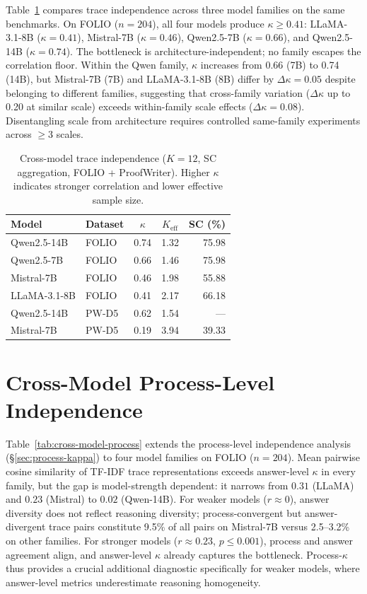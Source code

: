 Table~\ref{tab:cross_model_kappa} compares trace independence across three model families on the same benchmarks. On FOLIO ($n = 204$), all four models produce $\kappa \geq 0.41$: LLaMA-3.1-8B ($\kappa = 0.41$), Mistral-7B ($\kappa = 0.46$), Qwen2.5-7B ($\kappa = 0.66$), and Qwen2.5-14B ($\kappa = 0.74$). The bottleneck is architecture-independent; no family escapes the correlation floor. Within the Qwen family, $\kappa$ increases from 0.66 (7B) to 0.74 (14B), but Mistral-7B (7B) and LLaMA-3.1-8B (8B) differ by $\Delta\kappa = 0.05$ despite belonging to different families, suggesting that cross-family variation ($\Delta\kappa$ up to 0.20 at similar scale) exceeds within-family scale effects ($\Delta\kappa = 0.08$). Disentangling scale from architecture requires controlled same-family experiments across $\geq$3 scales.

\begin{table}[h]
\centering
\small
\caption{Cross-model trace independence ($K = 12$, SC aggregation, FOLIO + ProofWriter). Higher $\kappa$ indicates stronger correlation and lower effective sample size.}
\label{tab:cross_model_kappa}
\begin{tabular}{@{}llccr@{}}
\toprule
Model & Dataset & $\kappa$ & $K_{\text{eff}}$ & SC (\%) \\
\midrule
Qwen2.5-14B & FOLIO & 0.74 & 1.32 & 75.98 \\
Qwen2.5-7B & FOLIO & 0.66 & 1.46 & 75.98 \\
Mistral-7B & FOLIO & 0.46 & 1.98 & 55.88 \\
LLaMA-3.1-8B & FOLIO & 0.41 & 2.17 & 66.18 \\
\addlinespace
Qwen2.5-14B & PW-D5 & 0.62 & 1.54 & --- \\
Mistral-7B & PW-D5 & 0.19 & 3.94 & 39.33 \\
\bottomrule
\end{tabular}
\end{table}


\section{Cross-Model Process-Level Independence}
\label{app:cross-model-process}

Table~\ref{tab:cross-model-process} extends the process-level independence analysis (\S\ref{sec:process-kappa}) to four model families on FOLIO ($n = 204$). Mean pairwise cosine similarity of TF-IDF trace representations exceeds answer-level $\kappa$ in every family, but the gap is model-strength dependent: it narrows from $0.31$ (LLaMA) and $0.23$ (Mistral) to $0.02$ (Qwen-14B). For weaker models ($r \approx 0$), answer diversity does not reflect reasoning diversity; process-convergent but answer-divergent trace pairs constitute 9.5\% of all pairs on Mistral-7B versus 2.5--3.2\% on other families. For stronger models ($r \approx 0.23$, $p \leq 0.001$), process and answer agreement align, and answer-level $\kappa$ already captures the bottleneck. Process-$\kappa$ thus provides a crucial additional diagnostic specifically for weaker models, where answer-level metrics underestimate reasoning homogeneity.

